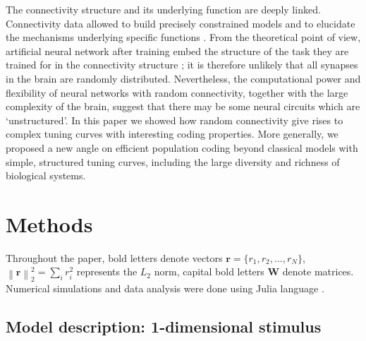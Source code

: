 \documentclass[a4paper]{article}%
\begin{document}
The connectivity structure and its underlying function are deeply linked.
Connectivity data allowed to build precisely constrained models
\cite{Litwin-Kumar2019ConstrainingDiagrams} and to elucidate the mechanisms
underlying specific functions \cite{Kim2014Space-timeRetina}. From the
theoretical point of view, artificial neural network after training embed the
structure of the task they are trained for in the connectivity structure
\cite{Farrell2020AutoencoderConnectomes}; it is therefore unlikely that all
synapses in the brain are randomly distributed. Nevertheless, the
computational power and flexibility of neural networks with random
connectivity, together with the large complexity of the brain, suggest that
there may be some neural circuits which are `unstructured'. In this paper we
showed how random connectivity give rises to complex tuning curves with
interesting coding properties. More generally, we proposed a new angle on
efficient population coding beyond classical models with simple, structured
tuning curves, including the large diversity and richness of biological systems.

\section{Methods}

\label{Se:Me} Throughout the paper, bold letters denote vectors $\mathbf{r} =
\{r_{1},r_{2},...,r_{N} \}$, $\left\|  \mathbf{r} \right\| _{2}^{2} = \sum_{i}
r_{i}^{2}$ represents the $L_{2}$ norm, capital bold letters $\mathbf{W}$
denote matrices. Numerical simulations and data analysis were done using Julia
language \cite{Bezanson2017Julia:Computing}.

\subsection{Model description: 1-dimensional stimulus}
\end{document}

